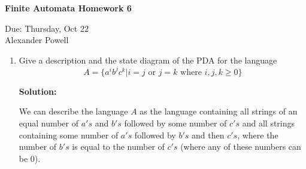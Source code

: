 \documentclass[11pt]{article}
\begin{document}
\begin{center}             %
\begin{LARGE}
{\bf Finite Automata Homework 6}
\end{LARGE}
\vskip 0.25cm      %

Due: Thursday, Oct 22\\  %
Alexander Powell
\end{center}

\begin{enumerate}

\item
Give a description and the state diagram of the PDA for the language
$$ A = \{ a^ib^jc^k | i=j \text{ or } j=k \text{ where } i,j,k \geq 0 \} $$

\textbf{Solution: }

We can describe the language $A$ as the language containing all strings of an equal number of $a's$ and $b's$ followed by some number of $c's$ and all strings containing some number of $a's$ followed by $b's$ and then $c's$, where the number of $b's$ is equal to the number of $c's$ (where any of these numbers can be $0$).  


\end{enumerate}
\end{document}
